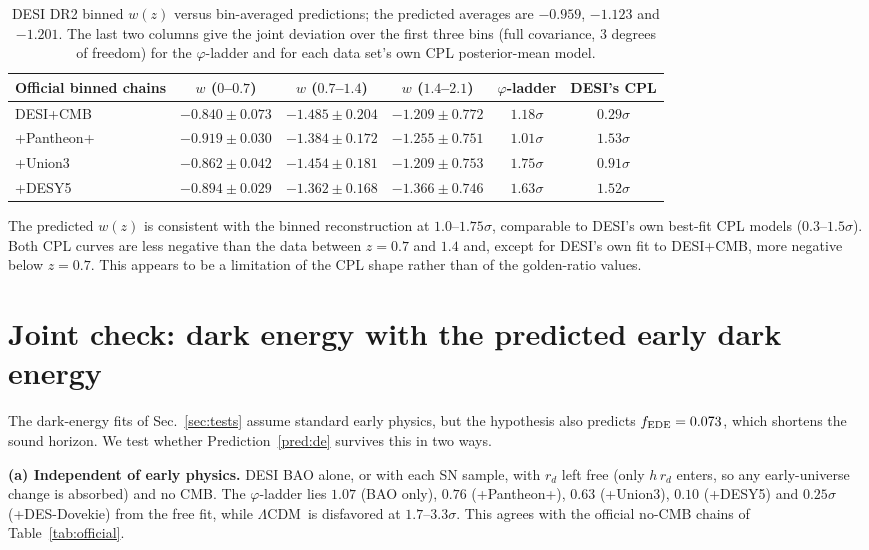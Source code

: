 \documentclass[11pt]{article}
\theoremstyle{definition}
\theoremstyle{remark}
\newcommand{\gr}{\varphi}
\newcommand{\LCDM}{$\Lambda$CDM}
\newcommand{\fede}{f_{\rm EDE}}
\begin{document}
\begin{table}[h]
\centering
\small
\begin{tabular}{lccccc}
\toprule
Official binned chains & $w$ ($0$--$0.7$) & $w$ ($0.7$--$1.4$) & $w$ ($1.4$--$2.1$) & $\gr$-ladder & DESI's CPL \\
\midrule
DESI+CMB & $-0.840 \pm 0.073$ & $-1.485 \pm 0.204$ & $-1.209 \pm 0.772$ & $1.18\sigma$ & $0.29\sigma$ \\
+Pantheon+ & $-0.919 \pm 0.030$ & $-1.384 \pm 0.172$ & $-1.255 \pm 0.751$ & $1.01\sigma$ & $1.53\sigma$ \\
+Union3 & $-0.862 \pm 0.042$ & $-1.454 \pm 0.181$ & $-1.209 \pm 0.753$ & $1.75\sigma$ & $0.91\sigma$ \\
+DESY5 & $-0.894 \pm 0.029$ & $-1.362 \pm 0.168$ & $-1.366 \pm 0.746$ & $1.63\sigma$ & $1.52\sigma$ \\
\bottomrule
\end{tabular}
\caption{DESI DR2 binned $w(z)$ versus bin-averaged predictions; the predicted averages are $-0.959$, $-1.123$ and $-1.201$. The last two columns give the joint deviation over the first three bins (full covariance, 3 degrees of freedom) for the $\gr$-ladder and for each data set's own CPL posterior-mean model.}
\label{tab:binned}
\end{table}

The predicted $w(z)$ is consistent with the binned reconstruction at $1.0$--$1.75\sigma$, comparable to DESI's own best-fit CPL models ($0.3$--$1.5\sigma$). Both CPL curves are less negative than the data between $z = 0.7$ and $1.4$ and, except for DESI's own fit to DESI+CMB, more negative below $z = 0.7$. This appears to be a limitation of the CPL shape rather than of the golden-ratio values.

\section{Joint check: dark energy with the predicted early dark energy}\label{sec:joint}

The dark-energy fits of Sec.~\ref{sec:tests} assume standard early physics, but the hypothesis also predicts $\fede = 0.073$, which shortens the sound horizon. We test whether Prediction~\ref{pred:de} survives this in two ways.

\textbf{(a) Independent of early physics.} DESI BAO alone, or with each SN sample, with $r_d$ left free (only $h\,r_d$ enters, so any early-universe change is absorbed) and no CMB. The $\gr$-ladder lies $1.07$ (BAO only), $0.76$ (+Pantheon+), $0.63$ (+Union3), $0.10$ (+DESY5) and $0.25\sigma$ (+DES-Dovekie) from the free fit, while \LCDM\ is disfavored at $1.7$--$3.3\sigma$. This agrees with the official no-CMB chains of Table~\ref{tab:official}.
\end{document}
